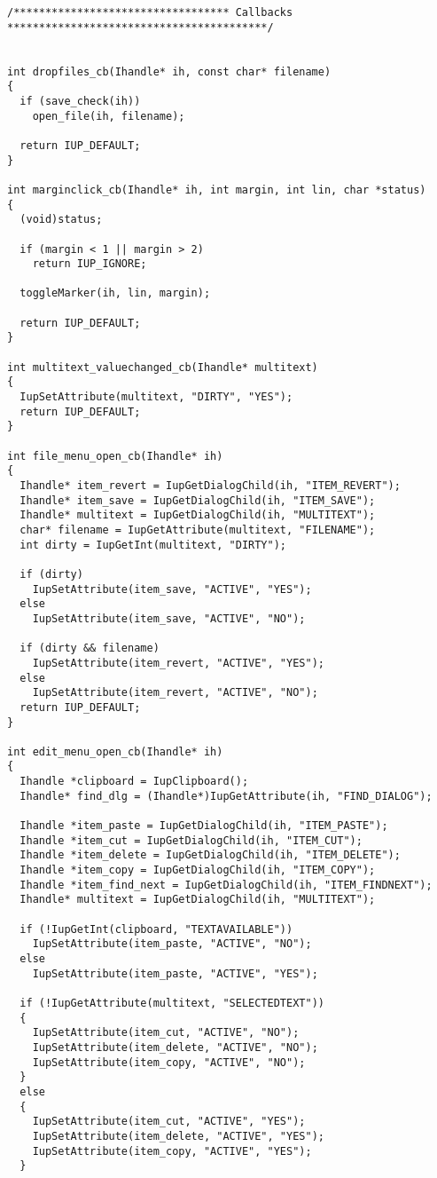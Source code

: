 \documentclass{ctexart}
\begin{document}
\begin{lstlisting}
/********************************** Callbacks *****************************************/


int dropfiles_cb(Ihandle* ih, const char* filename)
{
  if (save_check(ih))
    open_file(ih, filename);

  return IUP_DEFAULT;
}

int marginclick_cb(Ihandle* ih, int margin, int lin, char *status)
{
  (void)status;

  if (margin < 1 || margin > 2)
    return IUP_IGNORE;

  toggleMarker(ih, lin, margin);

  return IUP_DEFAULT;
}

int multitext_valuechanged_cb(Ihandle* multitext)
{
  IupSetAttribute(multitext, "DIRTY", "YES");
  return IUP_DEFAULT;
}

int file_menu_open_cb(Ihandle* ih)
{
  Ihandle* item_revert = IupGetDialogChild(ih, "ITEM_REVERT");
  Ihandle* item_save = IupGetDialogChild(ih, "ITEM_SAVE");
  Ihandle* multitext = IupGetDialogChild(ih, "MULTITEXT");
  char* filename = IupGetAttribute(multitext, "FILENAME");
  int dirty = IupGetInt(multitext, "DIRTY");

  if (dirty)
    IupSetAttribute(item_save, "ACTIVE", "YES");
  else
    IupSetAttribute(item_save, "ACTIVE", "NO");

  if (dirty && filename)
    IupSetAttribute(item_revert, "ACTIVE", "YES");
  else
    IupSetAttribute(item_revert, "ACTIVE", "NO");
  return IUP_DEFAULT;
}

int edit_menu_open_cb(Ihandle* ih)
{
  Ihandle *clipboard = IupClipboard();
  Ihandle* find_dlg = (Ihandle*)IupGetAttribute(ih, "FIND_DIALOG");

  Ihandle *item_paste = IupGetDialogChild(ih, "ITEM_PASTE");
  Ihandle *item_cut = IupGetDialogChild(ih, "ITEM_CUT");
  Ihandle *item_delete = IupGetDialogChild(ih, "ITEM_DELETE");
  Ihandle *item_copy = IupGetDialogChild(ih, "ITEM_COPY");
  Ihandle *item_find_next = IupGetDialogChild(ih, "ITEM_FINDNEXT");
  Ihandle* multitext = IupGetDialogChild(ih, "MULTITEXT");

  if (!IupGetInt(clipboard, "TEXTAVAILABLE"))
    IupSetAttribute(item_paste, "ACTIVE", "NO");
  else
    IupSetAttribute(item_paste, "ACTIVE", "YES");

  if (!IupGetAttribute(multitext, "SELECTEDTEXT"))
  {
    IupSetAttribute(item_cut, "ACTIVE", "NO");
    IupSetAttribute(item_delete, "ACTIVE", "NO");
    IupSetAttribute(item_copy, "ACTIVE", "NO");
  }
  else
  {
    IupSetAttribute(item_cut, "ACTIVE", "YES");
    IupSetAttribute(item_delete, "ACTIVE", "YES");
    IupSetAttribute(item_copy, "ACTIVE", "YES");
  }


\end{lstlisting}
\end{document}
